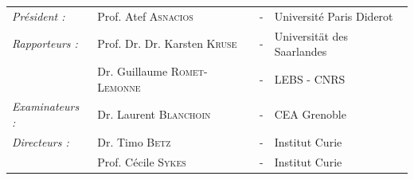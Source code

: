 \documentclass[A4paperpaper,11pt,english]{sphinxmanual}
\begin{document}
\begin{center}
\begin{minipage}{0.75\linewidth}
\begin{center}
            \end{center}
            \begin{center}
            \noindent \large 
            \begin{tabular}{llcl}
                \textit{Président :}    & Prof. Atef            \textsc{Asnacios }       & - & Université Paris Diderot \\
                \textit{Rapporteurs :}  & Prof. Dr. Dr. Karsten \textsc{Kruse}           & - & Universität des Saarlandes \\
                                        & Dr. Guillaume         \textsc{Romet-Lemonne}   & - & LEBS - CNRS\\
                            
                \textit{Examinateurs :} & Dr. Laurent           \textsc{Blanchoin}       & - & CEA Grenoble\\
                \textit{Directeurs : }  & Dr. Timo              \textsc{Betz}            & - & Institut Curie\\
                                        & Prof. Cécile          \textsc{Sykes}           & - & Institut Curie\\
                            
            \end{tabular}
            \end{center}
        \end{minipage}
    \end{center}
    \clearpage
    \null
    \thispagestyle{empty}%
    \addtocounter{page}{-1}%
    \newpage


\tableofcontents
\cleardoublepage
\pagestyle{normal}
\setlength{\headheight}{14pt}
 
\end{document}
